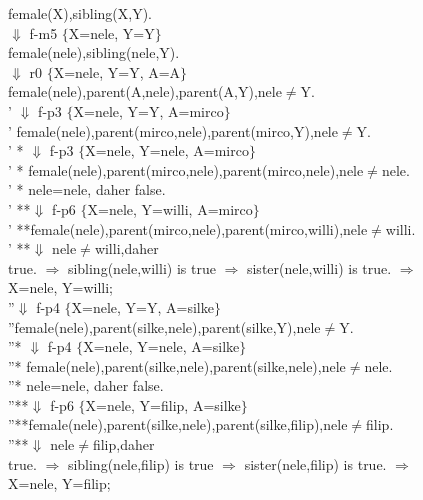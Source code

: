 \documentclass[11pt]{article}
\begin{document}
{\begin{flushleft}
 female(X),sibling(X,Y).\\
 $\Downarrow$ f-m5 $\lbrace$X=nele, Y=Y$\rbrace$\\
 female(nele),sibling(nele,Y).\\
 $\Downarrow$ r0 $\lbrace$X=nele, Y=Y, A=A$\rbrace$\\
 female(nele),parent(A,nele),parent(A,Y),nele$\neq$Y. \\
' $\Downarrow$ f-p3 $\lbrace$X=nele, Y=Y, A=mirco$\rbrace$\\
' female(nele),parent(mirco,nele),parent(mirco,Y),nele$\neq$Y. \\
' * $\Downarrow$ f-p3 $\lbrace$X=nele, Y=nele, A=mirco$\rbrace$\\
' * female(nele),parent(mirco,nele),parent(mirco,nele),nele$\neq$nele. \\
' * nele=nele, daher false.\\
' **$\Downarrow$ f-p6 $\lbrace$X=nele, Y=willi, A=mirco$\rbrace$\\
' **female(nele),parent(mirco,nele),parent(mirco,willi),nele$\neq$willi. \\
' **$\Downarrow$ nele$\neq$willi,daher \\
true. $\Rightarrow$ sibling(nele,willi)  is true $\Rightarrow$ sister(nele,willi) is true. $\Rightarrow$\\
X=nele, Y=willi;\\
''$\Downarrow$ f-p4 $\lbrace$X=nele, Y=Y, A=silke$\rbrace$\\
''female(nele),parent(silke,nele),parent(silke,Y),nele$\neq$Y. \\
''* $\Downarrow$ f-p4 $\lbrace$X=nele, Y=nele, A=silke$\rbrace$\\
''* female(nele),parent(silke,nele),parent(silke,nele),nele$\neq$nele. \\
''* nele=nele, daher false.\\
''**$\Downarrow$ f-p6 $\lbrace$X=nele, Y=filip, A=silke$\rbrace$\\
''**female(nele),parent(silke,nele),parent(silke,filip),nele$\neq$filip. \\
''**$\Downarrow$ nele$\neq$filip,daher \\
true. $\Rightarrow$ sibling(nele,filip)  is true $\Rightarrow$ sister(nele,filip) is true. $\Rightarrow$\\
X=nele, Y=filip;
 \end{flushleft} 
 }
\end{document}
